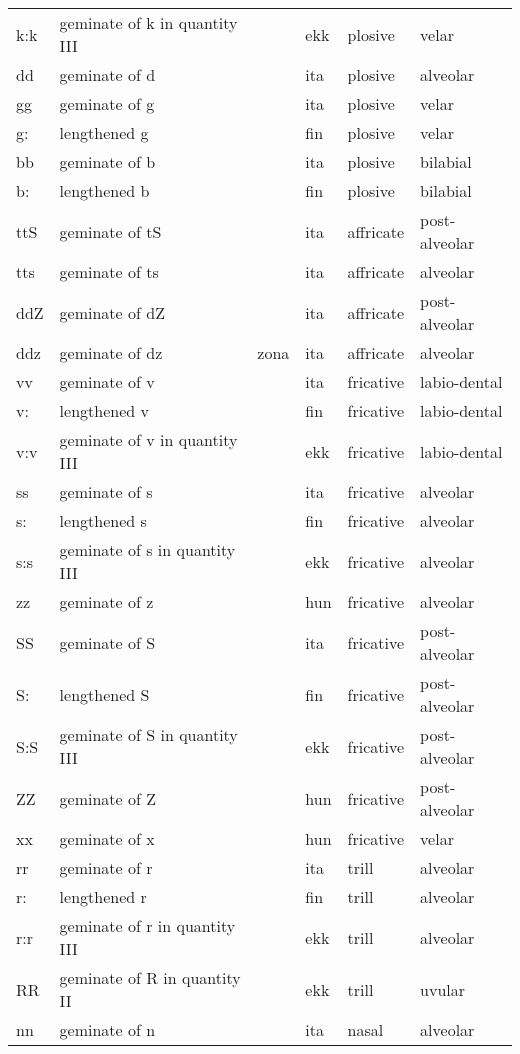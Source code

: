 {\begin{longtable}{l|p{.3\linewidth}|p{.15\linewidth}|l|p{.15\linewidth}|l}
	k:k	& geminate of k in quantity III	& 	& ekk	& plosive	& velar	\\
	dd	& geminate of d	& 	& ita	& plosive	& alveolar	\\
	gg	& geminate of g	& 	& ita	& plosive	& velar	\\
	g:	& lengthened g	& 	& fin	& plosive	& velar	\\
	bb	& geminate of b	& 	& ita	& plosive	& bilabial	\\
	b:	& lengthened b	& 	& fin	& plosive	& bilabial	\\
	ttS	& geminate of tS	& 	& ita	& affricate	& post-alveolar	\\
	tts	& geminate of ts	& 	& ita	& affricate	& alveolar	\\
	ddZ	& geminate of dZ	& 	& ita	& affricate	& post-alveolar	\\
	ddz	& geminate of dz	& zona	& ita	& affricate	& alveolar	\\
	vv	& geminate of v	& 	& ita	& fricative	& labio-dental	\\
	v:	& lengthened v	& 	& fin	& fricative	& labio-dental	\\
	v:v	& geminate of v in quantity III	& 	& ekk	& fricative	& labio-dental	\\
	ss	& geminate of s	& 	& ita	& fricative	& alveolar	\\
	s:	& lengthened s	& 	& fin	& fricative	& alveolar	\\
	s:s	& geminate of s in quantity III	& 	& ekk	& fricative	& alveolar	\\
	zz	& geminate of z	& 	& hun	& fricative	& alveolar	\\
	SS	& geminate of S	& 	& ita	& fricative	& post-alveolar	\\
	S:\	& lengthened S	& 	& fin	& fricative	& post-alveolar	\\
	S:S	& geminate of S in quantity III	& 	& ekk	& fricative	& post-alveolar	\\
	ZZ	& geminate of Z	& 	& hun	& fricative	& post-alveolar	\\
	xx	& geminate of x	& 	& hun	& fricative	& velar	\\
	rr	& geminate of r	& 	& ita	& trill	& alveolar	\\
	r:	& lengthened r	& 	& fin	& trill	& alveolar	\\
	r:r	& geminate of r in quantity III	& 	& ekk	& trill	& alveolar	\\
	RR	& geminate of R in quantity II	& 	& ekk	& trill	& uvular	\\
	nn	& geminate of n	& 	& ita	& nasal	& alveolar	\\

\end{longtable}}
